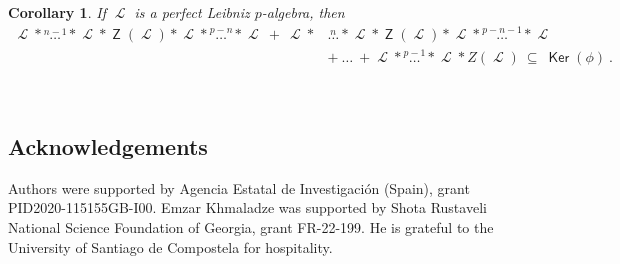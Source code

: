 \documentclass[12pt, reqno]{amsart}
\newtheorem{corollary}[definition]{Corollary}
\def\ele{\operatorname{\mathcal{L}}}
\DeclareMathOperator{\Ker}{\mathsf {Ker}}
\DeclareMathOperator{\Z}{\mathsf {Z}}
\begin{document}
\begin{corollary} If ${\ele}$ is a perfect Leibniz $p$-algebra, then
\begin{align*}
{\ele} \ast \stackrel{n-1}\dots  \ast {\ele} \ast \Z({\ele}) \ast {\ele} \ast \stackrel{p-n}\dots \ast
{\ele}\  + \ {\ele} \ast& \stackrel{n}\dots \ast {\ele} \ast \Z({\ele}) \ast {\ele} \ast \stackrel{p-n-1}\dots \ast
{\ele}   \\
& + \  \dots \ + {\ele} \ast \stackrel{p-1}\dots \ast {\ele} \ast  Z({\ele}) \ \subseteq \ {\Ker}(\phi) \ .
\end{align*}
\end{corollary}



\

\subsection*{Acknowledgements}

Authors were supported by  Agencia Estatal de Investigaci\'on (Spain), grant PID2020-115155GB-I00.
Emzar Khmaladze was supported by Shota Rustaveli National Science Foundation of Georgia, grant FR-22-199. He is grateful to the University of Santiago de Compostela for hospitality.
\end{document}
